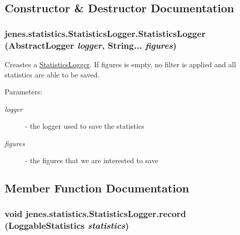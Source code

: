 \subsection{Constructor \& Destructor Documentation}
\hypertarget{classjenes_1_1statistics_1_1_statistics_logger_d4bf879bdfb673a6f82f3536fd5557b8}{
\subsubsection[StatisticsLogger]{\setlength{\rightskip}{0pt plus 5cm}jenes.statistics.StatisticsLogger.StatisticsLogger ({\bf AbstractLogger} {\em logger}, \/  String... {\em figures})}}
\label{classjenes_1_1statistics_1_1_statistics_logger_d4bf879bdfb673a6f82f3536fd5557b8}


Creastes a \hyperlink{classjenes_1_1statistics_1_1_statistics_logger}{StatisticsLogger}. If figures is empty, no filter is applied and all statistics are able to be saved.

\begin{Desc}
\item[Parameters:]
\begin{description}
\item[{\em logger}]- the logger used to save the statistics \item[{\em figures}]- the figures that we are interested to save \end{description}
\end{Desc}


\subsection{Member Function Documentation}
\hypertarget{classjenes_1_1statistics_1_1_statistics_logger_8f7fc89cbbd6c6aad447057cd3eb6dbe}{
\subsubsection[record]{\setlength{\rightskip}{0pt plus 5cm}void jenes.statistics.StatisticsLogger.record (LoggableStatistics {\em statistics})}}
\label{classjenes_1_1statistics_1_1_statistics_logger_8f7fc89cbbd6c6aad447057cd3eb6dbe}



